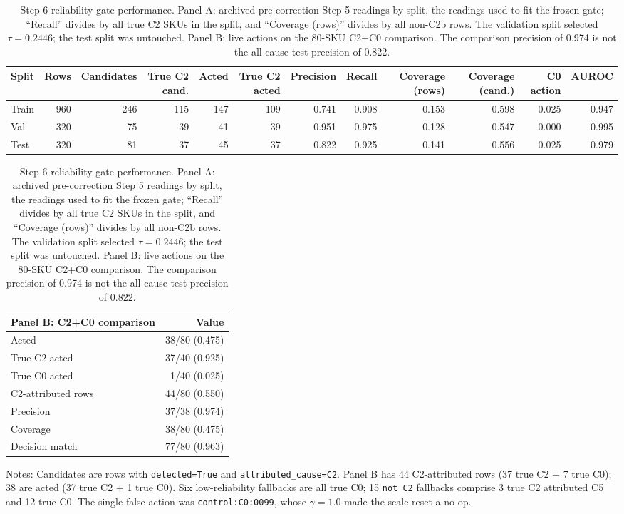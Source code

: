 \begin{table}[t]
\centering
\caption{Step 6 reliability-gate performance. Panel A: archived pre-correction Step 5 readings by split, the readings used to fit the frozen gate; ``Recall'' divides by all true C2 SKUs in the split, and ``Coverage (rows)'' divides by all non-C2b rows. The validation split selected $\tau=0.2446$; the test split was untouched. Panel B: live actions on the 80-SKU C2+C0 comparison. The comparison precision of 0.974 is not the all-cause test precision of 0.822.}
\label{tab:step6-gate}
\footnotesize
\setlength{\tabcolsep}{3pt}
\begin{tabular}{lrrrrrrrrrrr}
\toprule
Split & Rows & Candidates & True C2 cand. & Acted & True C2 acted & Precision & Recall & Coverage (rows) & Coverage (cand.) & C0 action & AUROC \\
\midrule
Train & 960 & 246 & 115 & 147 & 109 & 0.741 & 0.908 & 0.153 & 0.598 & 0.025 & 0.947 \\
Val & 320 & 75 & 39 & 41 & 39 & 0.951 & 0.975 & 0.128 & 0.547 & 0.000 & 0.995 \\
Test & 320 & 81 & 37 & 45 & 37 & 0.822 & 0.925 & 0.141 & 0.556 & 0.025 & 0.979 \\
\bottomrule
\end{tabular}
\par\smallskip
\begin{tabular}{lr}
\toprule
Panel B: C2+C0 comparison & Value \\
\midrule
Acted & 38/80 (0.475) \\
True C2 acted & 37/40 (0.925) \\
True C0 acted & 1/40 (0.025) \\
C2-attributed rows & 44/80 (0.550) \\
Precision & 37/38 (0.974) \\
Coverage & 38/80 (0.475) \\
Decision match & 77/80 (0.963) \\
\bottomrule
\end{tabular}
\par\smallskip
\footnotesize
Notes: Candidates are rows with \texttt{detected=True} and \texttt{attributed\_cause=C2}. Panel B has 44 C2-attributed rows (37 true C2 + 7 true C0); 38 are acted (37 true C2 + 1 true C0). Six low-reliability fallbacks are all true C0; 15 \texttt{not\_C2} fallbacks comprise 3 true C2 attributed C5 and 12 true C0. The single false action was \texttt{control:C0:0099}, whose $\gamma=1.0$ made the scale reset a no-op.
\end{table}
